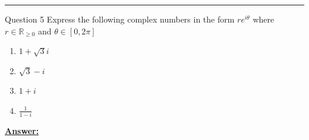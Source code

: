\documentclass{article}
\begin{document}
  \vskip 0.5cm
  \hrule 
  \vskip 0.5cm


\begin{mathdefinitionbox}{Question 5}
\vskip 0.5cm
Express the following complex numbers in the form $re^{i\theta}$ where $r \in \mathbb{R}_{\geq 0}$ and $\theta \in [0, 2\pi]$
  \begin{enumerate}[label=(\alph*)]
    \item $1 + \sqrt{3} i$ 
    \item $\sqrt{3} - i$ 
    \item $1 + i$ 
    \item $\frac{1}{1-i}$
  \end{enumerate}
\end{mathdefinitionbox}
  
\vskip 0.5cm
\underline{\textbf{Answer:}} 
\end{document}
